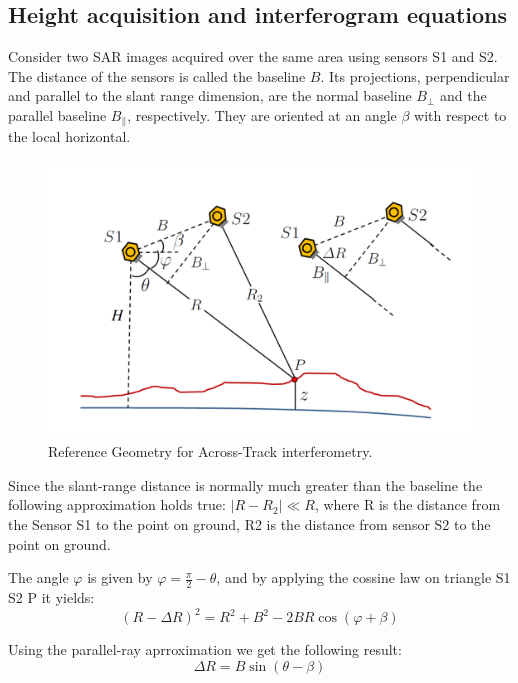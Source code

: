\subsection{Height acquisition and interferogram equations}
Consider two SAR images acquired over the same area using sensors S1 and S2. The distance of the sensors is called the baseline $B$. Its projections, perpendicular and parallel to the slant range dimension, are the normal baseline $B_{\perp}$ and the parallel baseline $B_{\parallel}$, respectively. They are oriented at an angle $\beta$ with respect to the local horizontal.

\begin{figure}[H]
    \centering
    \includegraphics[width=\linewidth]{Cap1/int.png}
    \caption{Reference Geometry for Across-Track interferometry. \cite{Paolathesis}}
    \label{fig:reference_geometry}
\end{figure}

Since the slant-range distance is normally much greater than the baseline the following approximation holds true: $|R - R_2| \ll R$, where R is the distance from the Sensor S1 to the point on ground, R2 is the distance from sensor S2 to the point on ground.

The angle $\varphi$ is given by $\varphi = \frac{\pi}{2} - \theta$, 
and by applying the cossine law on triangle S1 S2 P it yields:
\begin{equation}
    (R-\Delta R) ^2 = R^2 + B^2 - 2BR \cos(\varphi + \beta)
\end{equation}

Using the parallel-ray aprroximation we get the following result:
\begin{equation}
    \Delta R = B \sin(\theta - \beta)
\end{equation}

